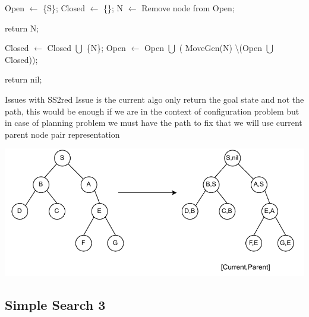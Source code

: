 \begin{algorithm}[ht]
\caption{SS2}
\begin{algorithmic}
\State Open \(\gets\) \{S\};
\State Closed \(\gets\) \{\}; 
\vspace{0.1cm}
\State N \(\gets\) Remove node from Open;

\vspace{0.07cm}
\State return N;
\Else

\State Closed \(\gets\) Closed \(\bigcup\) \{N\};
\State Open \(\gets\) Open \(\bigcup\) ( MoveGen(N) \textbackslash\hspace{0.1cm}(Open \(\bigcup\) Closed)); 
\EndIf

\vspace{0.07cm}
\EndWhile

\vspace{0.1cm}
\State return nil;
\end{algorithmic}
\end{algorithm}


\begin{prettyBox}{Issues with SS2}{red}
Issue is the current algo only return the goal state and not the path,
this would be enough if we are in the context of configuration problem
but in case of planning problem we must have the path to fix that we will use
current parent node pair representation
\end{prettyBox}

\vspace{0.35cm}
\begin{center}
    \includegraphics[height=0.3\textheight]{Chapters/Diagram/parent.drawio.pdf}
\end{center}



\vspace{0.5cm}
\subsection{Simple Search 3}

